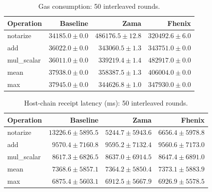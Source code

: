 \begin{table}[!t]
\centering\small
\caption{Gas consumption: 50 interleaved rounds.}
\label{tab:lifecycle-gasUsed}
\begin{tabular}{lrrr}
\hline
Operation & Baseline & Zama & Fhenix \\
\hline
notarize & \(34185.0 \pm 0.0\) & \(486176.5 \pm 12.8\) & \(320492.6 \pm 6.0\) \\
add & \(36022.0 \pm 0.0\) & \(343060.5 \pm 1.3\) & \(343751.0 \pm 0.0\) \\
mul\_scalar & \(36011.0 \pm 0.0\) & \(339219.4 \pm 1.4\) & \(482917.0 \pm 0.0\) \\
mean & \(37938.0 \pm 0.0\) & \(358387.5 \pm 1.3\) & \(406004.0 \pm 0.0\) \\
max & \(37945.0 \pm 0.0\) & \(344626.8 \pm 1.0\) & \(347930.0 \pm 0.0\) \\
\hline
\end{tabular}
\end{table}

\begin{table}[!t]
\centering\small
\caption{Host-chain receipt latency (ms): 50 interleaved rounds.}
\label{tab:lifecycle-confirmationMs}
\begin{tabular}{lrrr}
\hline
Operation & Baseline & Zama & Fhenix \\
\hline
notarize & \(13226.6 \pm 5895.5\) & \(5244.7 \pm 5943.6\) & \(6656.4 \pm 5978.8\) \\
add & \(9570.4 \pm 7160.8\) & \(9595.2 \pm 7132.4\) & \(9560.6 \pm 7173.0\) \\
mul\_scalar & \(8617.3 \pm 6826.5\) & \(8637.0 \pm 6914.5\) & \(8647.4 \pm 6891.0\) \\
mean & \(7368.6 \pm 5857.1\) & \(7364.2 \pm 5850.4\) & \(7373.1 \pm 5883.9\) \\
max & \(6875.4 \pm 5603.1\) & \(6912.5 \pm 5667.9\) & \(6926.9 \pm 5578.5\) \\
\hline
\end{tabular}
\end{table}


